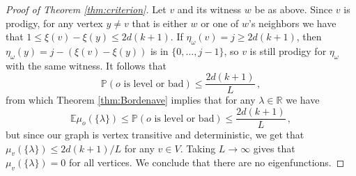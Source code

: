 \documentclass[10pt,a4paper]{amsart}
\newcommand{\R}{\mathbb R}
\begin{document}
\begin{proof}[Proof of Theorem \ref{thm:criterion}]
Let $v$ and its witness $w$ be as above. Since $v$ is prodigy, for any vertex $y\neq v$ that is either $w$ or one of $w$'s neighbors we have that $1 \leq \xi(v)-\xi(y) \leq 2d(k+1)$. If $\eta_\omega(v) = j \geq 2d(k+1)$, then $\eta_\omega(y) = j - (\xi(v)-\xi(y))$ is in $\{0,\ldots, j-1\}$, so $v$ is still prodigy for $\eta_\omega$ with the same witness. It follows that 
$$ \mathbb P(o\text{ is level or bad})\leq\frac{2d(k+1)}{L} \, ,$$
from which Theorem \ref{thm:Bordenave} implies that for any $\lambda\in \R$
we have
$$ \mathbb E\mu_o(\{\lambda\})
  \leq\mathbb P(o\text{ is level or bad})
  \leq\frac{2d(k+1)}{L} \, ,$$
but since our graph is vertex transitive and deterministic, we get that $\mu_v(\{\lambda\}) \leq 2d(k+1)/L$ for any $v\in V$. Taking $L\to\infty$ gives that $\mu_v(\{\lambda\})=0$ for all vertices. We conclude that there are no eigenfunctions. 
\end{proof}
\end{document}
